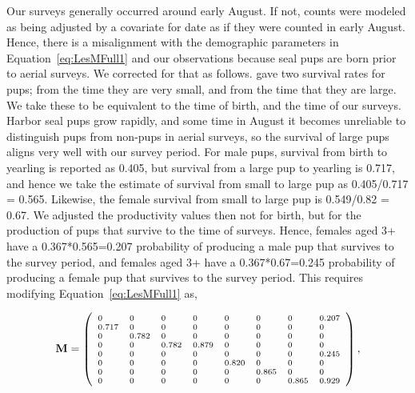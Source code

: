 \documentclass[12pt, titlepage]{article}\usepackage[]{graphicx}\usepackage[]{color}
\def\bM{\mathbf{M}}
\begin{document}
Our surveys generally occurred around early August.  If not, counts were modeled as being adjusted by a covariate for date as if they were counted in early August.  Hence, there is a misalignment with the demographic parameters in Equation~\ref{eq:LesMFull1} and our observations because seal pups are born prior to aerial surveys.  We corrected for that as follows.  \citet{Hast:Smal:Pend:sex:2012} gave two survival rates for pups; from the time they are very small, and from the time that they are large.  We take these to be equivalent to the time of birth, and the time of our surveys.  Harbor seal pups grow rapidly, and some time in August it becomes unreliable to distinguish pups from non-pups in aerial surveys, so the survival of large pups aligns very well with our survey period.  For male pups, survival from birth to yearling is reported as 0.405, but survival from a large pup to yearling is 0.717, and hence we take the estimate of survival from small to large pup as 0.405/0.717 = 0.565.  Likewise, the female survival from small to large pup is 0.549/0.82 = 0.67.  We adjusted the productivity values then not for birth, but for the production of pups that survive to the time of surveys.  Hence, females aged 3+ have a 0.367*0.565=0.207 probability of producing a male pup that survives to the survey period, and females aged 3+ have a 0.367*0.67=0.245 probability of producing a female pup that survives to the survey period.  This requires modifying Equation~\ref{eq:LesMFull1} as,

\begin{equation} \label{eq:LesMFull2}
  \bM = \left( \mbox{\scriptsize$\begin{array}{llllllll}
 0 & 0 & 0 & 0 & 0 & 0 & 0 & 0.207 \\ 
  0.717 & 0 & 0 & 0 & 0 & 0 & 0 & 0 \\ 
  0 & 0.782 & 0 & 0 & 0 & 0 & 0 & 0 \\ 
  0 & 0 & 0.782 & 0.879 & 0 & 0 & 0 & 0 \\ 
  0 & 0 & 0 & 0 & 0 & 0 & 0 & 0.245 \\ 
  0 & 0 & 0 & 0 & 0.820 & 0 & 0 & 0 \\ 
  0 & 0 & 0 & 0 & 0 & 0.865 & 0 & 0 \\ 
  0 & 0 & 0 & 0 & 0 & 0 & 0.865 & 0.929 \\ 
  
  \end{array} $} \right),
\end{equation}
 
\end{document}
